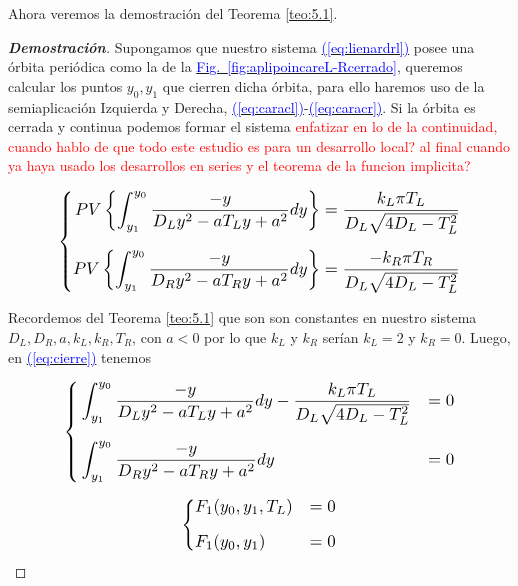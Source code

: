 \documentclass[12pt,a4paper]{report} %
\newcommand{\fref}[1]{\hyperref[#1]{\textcolor{blue}{Fig.~\ref*{#1}}}}
\newcommand{\eref}[1]{\hyperref[#1]{\textcolor{blue}{(\ref*{#1})}}}
\newcommand{\fref}[1]{\hyperref[#1]{\textcolor{blue}{\textit{Fig.~\ref*{#1}}}}}
\newcommand{\eref}[1]{\hyperref[#1]{\textcolor{blue}{\textit{(\ref*{#1})}}}}
\begin{document}
	\vspace{0.5cm}\noindent Ahora veremos la demostración del Teorema \ref{teo:5.1}.
	\begin{proof}[\textbf{Demostración}]
		\label{dem5.1}
	Supongamos que nuestro sistema \eref{eq:lienardrl} posee una órbita periódica como la de la \fref{fig:aplipoincareL-Rcerrado}, queremos calcular los puntos $y_0, y_1$ que cierren dicha órbita, para ello haremos uso de la semiaplicación Izquierda y Derecha, \eref{eq:caracl}-\eref{eq:caracr}. Si la órbita es cerrada  y continua podemos formar el sistema \textcolor{red}{enfatizar en lo de la continuidad, cuando hablo de que todo este estudio es para un desarrollo local? al final cuando ya haya usado los desarrollos en series y el teorema de la funcion implicita?}
	
	\begin{equation}
		\label{eq:cierre}
		\scalebox{1.2}{$\displaystyle
			\left\{
			\begin{aligned}
				PV\left\{\int_{y_1}^{y_0}\frac{-y}{D_Ly^2-aT_Ly+a^2}dy\right\}&=\frac{k_L\pi T_L}{D_L\sqrt{4D_L-T_L^2}}
				\\[2mm]
				PV\left\{\int_{y_1}^{y_0}\frac{-y}{D_Ry^2-aT_Ry+a^2}dy\right\}&=\frac{-k_R\pi T_R}{D_L\sqrt{4D_L-T_L^2}}
			\end{aligned}
			\right. 
			$}
	\end{equation}\smallskip
	
	\vspace{0.5cm}\noindent Recordemos del Teorema \ref{teo:5.1} que son son constantes en nuestro sistema $D_L,D_R,a,k_L,k_R,T_R$, con $a<0$ por lo que $k_L$ y $k_R$ serían $k_L=2$ y $k_R=0$. Luego, en \eref{eq:cierre} tenemos
	
	\begin{equation}
		\label{eq:cierre2}
		\scalebox{1.2}{$\displaystyle
			\left\{
			\begin{aligned}
				&\int_{y_1}^{y_0}\frac{-y}{D_Ly^2-aT_Ly+a^2}dy-\frac{k_L\pi T_L}{D_L\sqrt{4D_L-T_L^2}}&=0
				\\[2mm]
				&\int_{y_1}^{y_0}\frac{-y}{D_Ry^2-aT_Ry+a^2}dy&=0
			\end{aligned}
			\right. 
			$}
	\end{equation}\smallskip
	
	\begin{equation}
		\label{eq:cierre3}
		\scalebox{1.2}{$\displaystyle
			\left\{
			\begin{aligned}
				&F_1(y_0,y_1,T_L)&=0
				\\[2mm]
				&F_1(y_0,y_1)&=0
			\end{aligned}
			\right. 
			$}
	\end{equation}\smallskip
	

\end{proof}
\end{document}
